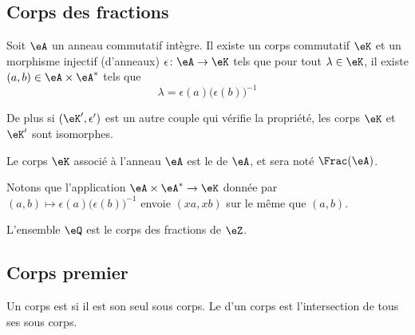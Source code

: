 \subsection{Corps des fractions}

\begin{theorem}     \label{ThogbhWgo}
    Soit \( \eA\) un anneau commutatif intègre. Il existe un corps commutatif \( \eK\) et un morphisme injectif (d'anneaux) \( \epsilon\colon \eA\to \eK\) tels que pour tout \( \lambda\in\eK\), il existe \( (a,b)\in \eA\times \eA^*\) tels que
    \begin{equation}
        \lambda=\epsilon(a)\big( \epsilon(b) \big)^{-1}
    \end{equation}

    De plus si \( (\eK',\epsilon')\) est un autre couple qui vérifie la propriété, les corps \( \eK\) et \( \eK'\) sont isomorphes.
\end{theorem}
Le corps \( \eK\) associé à l'anneau \( \eA\) est le  de \( \eA\), et sera noté \( \Frac(\eA)\).

Notons que l'application \( \eA\times \eA^*\to \eK\) donnée par \( (a,b)\mapsto \epsilon(a)\big( \epsilon(b) \big)^{-1}\) envoie \( (xa,xb)\) sur le même que \( (a,b)\).

L'ensemble \( \eQ\) est le corps des fractions de \( \eZ\).

\subsection{Corps premier}
\label{subseccorpspremhBlYIv}

\begin{definition}
    Un corps est  si il est son seul sous corps. Le  d'un corps est l'intersection de tous ses sous corps.
\end{definition}

